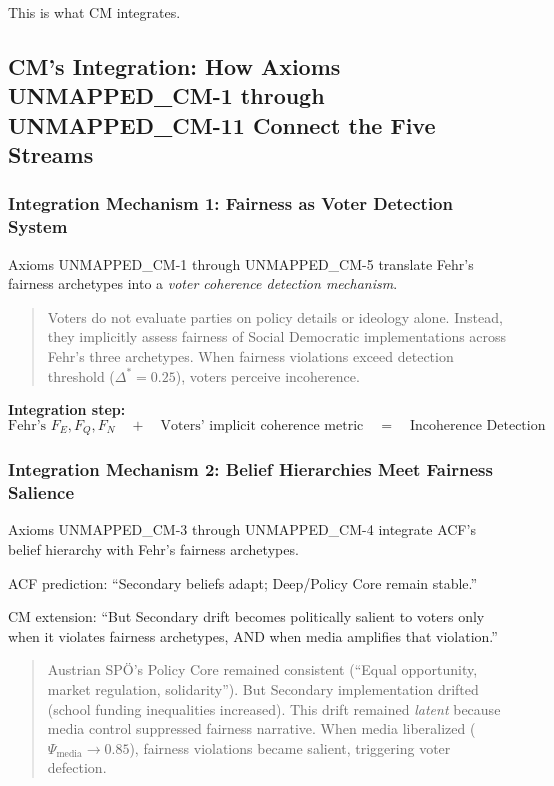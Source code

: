 This is what CM integrates.

\subsection{CM's Integration: How Axioms UNMAPPED_CM-1 through UNMAPPED_CM-11 Connect the Five Streams}

\subsubsection{Integration Mechanism 1: Fairness as Voter Detection System}

Axioms UNMAPPED_CM-1 through UNMAPPED_CM-5 translate Fehr's fairness archetypes into a \textit{voter coherence detection mechanism}.

\begin{quote}
Voters do not evaluate parties on policy details or ideology alone. Instead, they implicitly assess
fairness of Social Democratic implementations across Fehr's three archetypes. When fairness violations
exceed detection threshold ($\Delta^* = 0.25$), voters perceive incoherence.
\end{quote}

\textbf{Integration step:}
\begin{equation}
\text{Fehr's } F_E, F_Q, F_N \quad + \quad \text{Voters' implicit coherence metric} \quad = \quad \text{Incoherence Detection}
\end{equation}

\subsubsection{Integration Mechanism 2: Belief Hierarchies Meet Fairness Salience}

Axioms UNMAPPED_CM-3 through UNMAPPED_CM-4 integrate ACF's belief hierarchy with Fehr's fairness archetypes.

ACF prediction: ``Secondary beliefs adapt; Deep/Policy Core remain stable.''

CM extension: ``But Secondary drift becomes politically salient to voters only when it violates
fairness archetypes, AND when media amplifies that violation.''

\begin{quote}
Austrian SPÖ's Policy Core remained consistent (``Equal opportunity, market regulation, solidarity'').
But Secondary implementation drifted (school funding inequalities increased). This drift remained
\textit{latent} because media control suppressed fairness narrative. When media liberalized ($\Psi_{\text{media}} \rightarrow 0.85$),
fairness violations became salient, triggering voter defection.
\end{quote}

